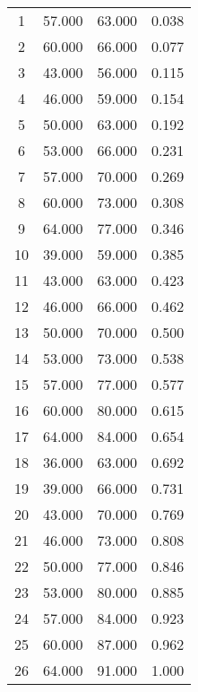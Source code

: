% 
\begin{tabular}{cccc}
  \hline
  \hline
1 & 57.000 & 63.000 & 0.038 \\ 
  2 & 60.000 & 66.000 & 0.077 \\ 
  3 & 43.000 & 56.000 & 0.115 \\ 
  4 & 46.000 & 59.000 & 0.154 \\ 
  5 & 50.000 & 63.000 & 0.192 \\ 
  6 & 53.000 & 66.000 & 0.231 \\ 
  7 & 57.000 & 70.000 & 0.269 \\ 
  8 & 60.000 & 73.000 & 0.308 \\ 
  9 & 64.000 & 77.000 & 0.346 \\ 
  10 & 39.000 & 59.000 & 0.385 \\ 
  11 & 43.000 & 63.000 & 0.423 \\ 
  12 & 46.000 & 66.000 & 0.462 \\ 
  13 & 50.000 & 70.000 & 0.500 \\ 
  14 & 53.000 & 73.000 & 0.538 \\ 
  15 & 57.000 & 77.000 & 0.577 \\ 
  16 & 60.000 & 80.000 & 0.615 \\ 
  17 & 64.000 & 84.000 & 0.654 \\ 
  18 & 36.000 & 63.000 & 0.692 \\ 
  19 & 39.000 & 66.000 & 0.731 \\ 
  20 & 43.000 & 70.000 & 0.769 \\ 
  21 & 46.000 & 73.000 & 0.808 \\ 
  22 & 50.000 & 77.000 & 0.846 \\ 
  23 & 53.000 & 80.000 & 0.885 \\ 
  24 & 57.000 & 84.000 & 0.923 \\ 
  25 & 60.000 & 87.000 & 0.962 \\ 
  26 & 64.000 & 91.000 & 1.000 \\ 
   \hline
\end{tabular}
